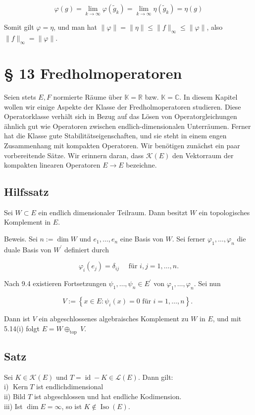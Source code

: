 \documentclass[10pt, letterpaper]{article}
\begin{document}
$$
\varphi(g)=\lim _{k \rightarrow \infty} \varphi\left(\tilde{g}_{k}\right)=\lim _{k \rightarrow \infty} \eta\left(\tilde{g}_{k}\right)=\eta(g)
$$

Somit gilt $\varphi=\eta$, und man hat $\|\varphi\|=\|\eta\| \leq\|f\|_{\infty} \leq\|\varphi\|$, also $\|f\|_{\infty}=\|\varphi\|$.

\section*{§ 13 Fredholmoperatoren}
Seien stets $E, F$ normierte Räume über $\mathbb{K}=\mathbb{R}$ bzw. $\mathbb{K}=\mathbb{C}$. In diesem Kapitel wollen wir einige Aspekte der Klasse der Fredholmoperatoren studieren. Diese Operatorklasse verhält sich in Bezug auf das Lösen von Operatorgleichungen ähnlich gut wie Operatoren zwischen endlich-dimensionalen Unterräumen. Ferner hat die Klasse gute Stabilitätseigenschaften, und sie steht in einem engen Zusammenhang mit kompakten Operatoren. Wir benötigen zunächst ein paar vorbereitende Sätze. Wir erinnern daran, dass $\mathcal{K}(E)$ den Vektorraum der kompakten linearen Operatoren $E \rightarrow E$ bezeichne.

\subsection*{Hilfssatz}
Sei $W \subset E$ ein endlich dimensionaler Teilraum. Dann besitzt $W$ ein topologisches Komplement in $E$.

Beweis. Sei $n:=\operatorname{dim} W$ und $e_{1}, \ldots, e_{n}$ eine Basis von $W$. Sei ferner $\varphi_{1}, \ldots, \varphi_{n}$ die duale Basis von $W^{\prime}$ definiert durch

$$
\varphi_{i}\left(e_{j}\right)=\delta_{i j} \quad \text { für } i, j=1, \ldots, n .
$$

Nach 9.4 existieren Fortsetzungen $\psi_{1}, \ldots, \psi_{n} \in E^{\prime}$ von $\varphi_{1}, \ldots, \varphi_{n}$. Sei nun

$$
V:=\left\{x \in E: \psi_{i}(x)=0 \text { für } i=1, \ldots, n\right\} \text {. }
$$

Dann ist $V$ ein abgeschlossenes algebraisches Komplement zu $W$ in $E$, und mit 5.14(i) folgt $E=W \oplus_{\text {top }} V$.

\subsection*{Satz}
Sei $K \in \mathcal{K}(E)$ und $T=\operatorname{id}-K \in \mathcal{L}(E)$. Dann gilt:\\
i) $\operatorname{Kern} T$ ist endlichdimensional\\
ii) Bild $T$ ist abgeschlossen und hat endliche Kodimension.\\
iii) Ist $\operatorname{dim} E=\infty$, so ist $K \notin \operatorname{Iso}(E)$.
\end{document}
